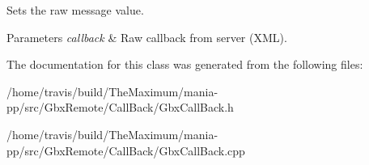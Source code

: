 Sets the raw message value. 


\begin{DoxyParams}{Parameters}
{\em callback} & Raw callback from server (X\-M\-L). \\
\hline
\end{DoxyParams}


The documentation for this class was generated from the following files\-:\begin{DoxyCompactItemize}
\item 
/home/travis/build/\-The\-Maximum/mania-\/pp/src/\-Gbx\-Remote/\-Call\-Back/Gbx\-Call\-Back.\-h\item 
/home/travis/build/\-The\-Maximum/mania-\/pp/src/\-Gbx\-Remote/\-Call\-Back/Gbx\-Call\-Back.\-cpp\end{DoxyCompactItemize}
